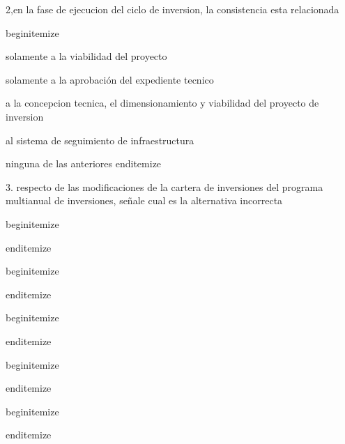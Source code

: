 2,en la fase de ejecucion del ciclo de inversion, la consistencia esta relacionada

begin{itemize}
			\item solamente a la viabilidad del proyecto 
 			\item solamente a la aprobación del expediente tecnico 
			\item a la concepcion tecnica, el dimensionamiento y viabilidad del proyecto de inversion 
			\item al sistema de seguimiento de infraestructura 
			\item ninguna de las anteriores
end{itemize}

3. respecto de las modificaciones de la cartera de inversiones del programa multianual de inversiones, señale cual es la alternativa incorrecta

begin{itemize}
			\item
 			\item
			\item
			\item
			\item
end{itemize}



begin{itemize}
			\item
 			\item
			\item
			\item
			\item
end{itemize}



begin{itemize}
			\item
 			\item
			\item
			\item
			\item
end{itemize}



begin{itemize}
			\item
 			\item
			\item
			\item
			\item
end{itemize}



begin{itemize}
			\item
 			\item
			\item
			\item
			\item
end{itemize}



